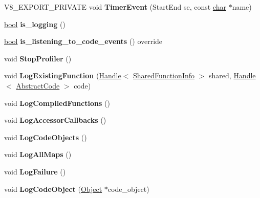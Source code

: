 \begin{DoxyCompactItemize}
\item 
\mbox{\label{classv8_1_1internal_1_1Logger_a9e1006be8887830cb167c3080a509b71}} 
V8\+\_\+\+E\+X\+P\+O\+R\+T\+\_\+\+P\+R\+I\+V\+A\+TE void {\bfseries Timer\+Event} (Start\+End se, const \mbox{\hyperlink{classchar}{char}} $\ast$name)
\item 
\mbox{\label{classv8_1_1internal_1_1Logger_aed323c6dffe4aabc969b080bfe782adf}} 
\mbox{\hyperlink{classbool}{bool}} {\bfseries is\+\_\+logging} ()
\item 
\mbox{\label{classv8_1_1internal_1_1Logger_a2c0ed08ed59a3a5f43a4830312bf6980}} 
\mbox{\hyperlink{classbool}{bool}} {\bfseries is\+\_\+listening\+\_\+to\+\_\+code\+\_\+events} () override
\item 
\mbox{\label{classv8_1_1internal_1_1Logger_af83f62b2d37eb53cf3b89eb10ee17bbe}} 
void {\bfseries Stop\+Profiler} ()
\item 
\mbox{\label{classv8_1_1internal_1_1Logger_a69a15af625beb6a875fc2734ba422afc}} 
void {\bfseries Log\+Existing\+Function} (\mbox{\hyperlink{classv8_1_1internal_1_1Handle}{Handle}}$<$ \mbox{\hyperlink{classv8_1_1internal_1_1SharedFunctionInfo}{Shared\+Function\+Info}} $>$ shared, \mbox{\hyperlink{classv8_1_1internal_1_1Handle}{Handle}}$<$ \mbox{\hyperlink{classv8_1_1internal_1_1AbstractCode}{Abstract\+Code}} $>$ code)
\item 
\mbox{\label{classv8_1_1internal_1_1Logger_a7372775745f2f974a600996232acc7d6}} 
void {\bfseries Log\+Compiled\+Functions} ()
\item 
\mbox{\label{classv8_1_1internal_1_1Logger_a4d77e3ce92369187c58127754a9fa149}} 
void {\bfseries Log\+Accessor\+Callbacks} ()
\item 
\mbox{\label{classv8_1_1internal_1_1Logger_acf57b8270cf5f12f6b1c1a4810011306}} 
void {\bfseries Log\+Code\+Objects} ()
\item 
\mbox{\label{classv8_1_1internal_1_1Logger_a4c12474fca554cda5288223741ea06ea}} 
void {\bfseries Log\+All\+Maps} ()
\item 
\mbox{\label{classv8_1_1internal_1_1Logger_ab5fc1e0f322695f69c7a6bcee79ceaa5}} 
void {\bfseries Log\+Failure} ()
\item 
\mbox{\label{classv8_1_1internal_1_1Logger_affdaa044e4ec347cb0853d9d91c63ff9}} 
void {\bfseries Log\+Code\+Object} (\mbox{\hyperlink{classv8_1_1internal_1_1Object}{Object}} $\ast$code\+\_\+object)
\end{DoxyCompactItemize}
